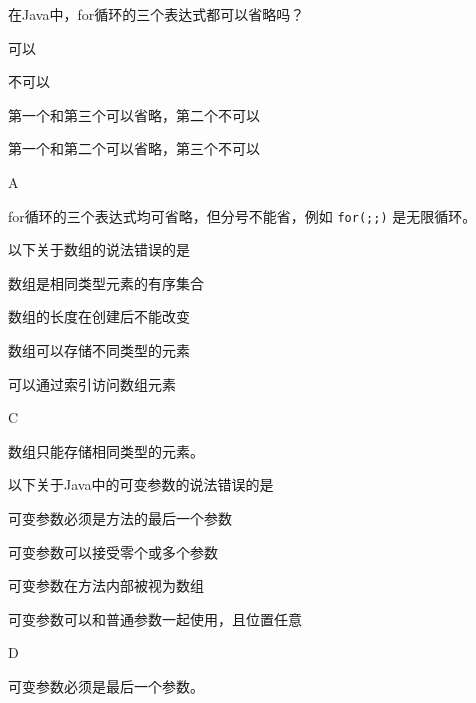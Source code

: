 \begin{question}
	在Java中，for循环的三个表达式都可以省略吗？
	\begin{options}
		\item 可以
		\item 不可以
		\item 第一个和第三个可以省略，第二个不可以
		\item 第一个和第二个可以省略，第三个不可以
	\end{options}
	\begin{answer}
		A
	\end{answer}
	\begin{explanation}
		for循环的三个表达式均可省略，但分号不能省，例如 \texttt{for(;;)} 是无限循环。
	\end{explanation}
\end{question}

\begin{question}
	以下关于数组的说法错误的是
	\begin{options}
		\item 数组是相同类型元素的有序集合
		\item 数组的长度在创建后不能改变
		\item 数组可以存储不同类型的元素
		\item 可以通过索引访问数组元素
	\end{options}
	\begin{answer}
		C
	\end{answer}
	\begin{explanation}
		数组只能存储相同类型的元素。
	\end{explanation}
\end{question}

\begin{question}
	以下关于Java中的可变参数的说法错误的是
	\begin{options}
		\item 可变参数必须是方法的最后一个参数
		\item 可变参数可以接受零个或多个参数
		\item 可变参数在方法内部被视为数组
		\item 可变参数可以和普通参数一起使用，且位置任意
	\end{options}
	\begin{answer}
		D
	\end{answer}
	\begin{explanation}
		可变参数必须是最后一个参数。
	\end{explanation}
\end{question}
